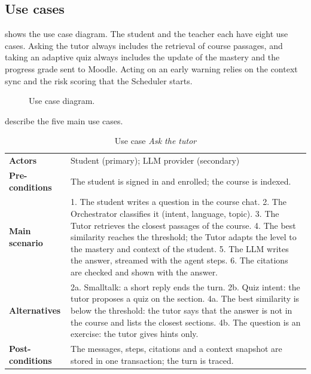 \subsection{Use cases}

 shows the use case diagram. The student and the
teacher each have eight use cases. Asking the tutor always includes the
retrieval of course passages, and taking an adaptive quiz always includes
the update of the mastery and the progress grade sent to Moodle. Acting on
an early warning relies on the context sync and the risk scoring that the
Scheduler starts.

\begin{figure}[htbp]
  \centering
  \caption{Use case diagram.}
  \label{fig-use-cases}
\end{figure}

 describe the five main use
cases.

\newcommand{\ucrow}[2]{\textbf{#1} & #2 \\}
\begin{table}[htbp]
\centering
\caption{Use case \emph{Ask the tutor}}
\label{tab-uc-tutor}
\small
\begin{tabularx}{\textwidth}{@{}L{2.6cm}Y@{}}
\toprule
\ucrow{Actors}{Student (primary); LLM provider (secondary)}
\ucrow{Pre-conditions}{The student is signed in and enrolled; the course is indexed.}
\ucrow{Main scenario}{1. The student writes a question in the course chat.
  2. The Orchestrator classifies it (intent, language, topic).
  3. The Tutor retrieves the closest passages of the course.
  4. The best similarity reaches the threshold; the Tutor adapts the level
  to the mastery and context of the student.
  5. The LLM writes the answer, streamed with the agent steps.
  6. The citations are checked and shown with the answer.}
\ucrow{Alternatives}{2a. Smalltalk: a short reply ends the turn.
  2b. Quiz intent: the tutor proposes a quiz on the section.
  4a. The best similarity is below the threshold: the tutor says that the
  answer is not in the course and lists the closest sections.
  4b. The question is an exercise: the tutor gives hints only.}
\ucrow{Post-conditions}{The messages, steps, citations and a context snapshot are stored in one transaction; the turn is traced.}
\bottomrule
\end{tabularx}
\end{table}

